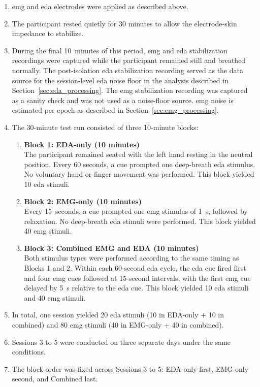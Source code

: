 \begin{enumerate}
    \item \gls{emg} and \gls{eda} electrodes were applied as described above.
    \item The participant rested quietly for 30 minutes to allow the electrode-skin impedance to stabilize.
    \item During the final 10~minutes of this period, \gls{emg} and \gls{eda} stabilization recordings were captured while the participant remained still and breathed normally. The post-isolation \gls{eda} stabilization recording served as the data source for the session-level \gls{eda} noise floor in the analysis described in Section~\ref{sec:eda_processing}. The \gls{emg} stabilization recording was captured as a sanity check and was not used as a noise-floor source. \gls{emg} noise is estimated per epoch as described in Section~\ref{sec:emg_processing}.
    \item The 30-minute test run consisted of three 10-minute blocks:
    \begin{enumerate}
        \item \textbf{Block 1: EDA-only (10 minutes)}\\ The participant remained seated with the left hand resting in the neutral position. Every 60 seconds, a cue prompted one deep-breath \gls{eda} stimulus. No voluntary hand or finger movement was performed. This block yielded 10 \gls{eda} stimuli.
        \item \textbf{Block 2: EMG-only (10 minutes)}\\ Every 15~seconds, a cue prompted one \gls{emg} stimulus of \SI{1}{\second}, followed by relaxation. No deep-breath \gls{eda} stimuli were performed. This block yielded 40 \gls{emg} stimuli.
        \item \textbf{Block 3: Combined EMG and EDA (10 minutes)}\\ Both stimulus types were performed according to the same timing as Blocks 1 and 2. Within each 60-second \gls{eda} cycle, the \gls{eda} cue fired first and four \gls{emg} cues followed at 15-second intervals, with the first \gls{emg} cue delayed by \SI{5}{\second} relative to the \gls{eda} cue. This block yielded 10 \gls{eda} stimuli and 40 \gls{emg} stimuli.
    \end{enumerate}
    \item In total, one session yielded 20 \gls{eda} stimuli (10 in EDA-only + 10 in combined) and 80 \gls{emg} stimuli (40 in EMG-only + 40 in combined).
    \item Sessions 3 to 5 were conducted on three separate days under the same conditions.
    \item The block order was fixed across Sessions 3 to 5: EDA-only first, EMG-only second, and Combined last.
\end{enumerate}

